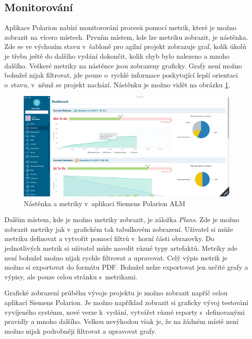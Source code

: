\documentclass[czech,master]{diploma}
\begin{document}
\subsection{Monitorování}
Aplikace Polarion nabízí monitorování procesů pomocí metrik, které je možno zobrazit na vícero místech. Prvním místem, kde lze metriku zobrazit, je nástěnka. Zde se ve výchozím stavu v~šabloně pro agilní projekt zobrazuje graf, kolik úkolů je třeba ještě do dalšího vydání dokončit, kolik chyb bylo nalezeno a mnoho dalšího. Veškeré metriky na nástěnce jsou zobrazeny graficky. Grafy není možno bohužel nijak filtrovat, jde pouze o~rychlé informace poskytující lepší orientaci o~stavu, v~němž se projekt nachází. Nástěnku je možno vidět na obrázku \ref{fig:polarion_dashboard}.

\begin{figure}[!ht]
    \centering
    \includegraphics[width=1\textwidth]{Diplomka/Figures/polarion_dashboard.png}
    \caption{Nástěnka a metriky v~aplikaci Siemens Polarion ALM}
    \label{fig:polarion_dashboard}
\end{figure}

Dalším místem, kde je možno metriky zobrazit,  je záložka \textit{Plans}. Zde je možno zobrazit metriky jak v~grafickém tak tabulkovém zobrazení. Uživatel si může metriku definovat a vytvořit pomocí filtrů v~horní části obrazovky. Do jednotlivých metrik si uživatel může navolit různé typy artefaktů. Metriky zde není bohužel možno nijak rychle filtrovat a upravovat. Celý výpis metrik je možno si exportovat do formátu PDF. Bohužel nelze exportovat jen určité grafy a výpisy, ale pouze celou stránku s~metrikami.

Grafické zobrazení průběhu vývoje projektu je možno zobrazit napříč celou aplikací Siemens Polarion. Je možno například zobrazit si graficky vývoj testování vyvíjeného systému, nové verze k~vydání, vytvářet různé reporty s~definovanými pravidly a mnoho dalšího. Velkou nevýhodou však je, že na žádném místě není možno nijak podrobněji filtrovat a upravovat grafy.
\end{document}
